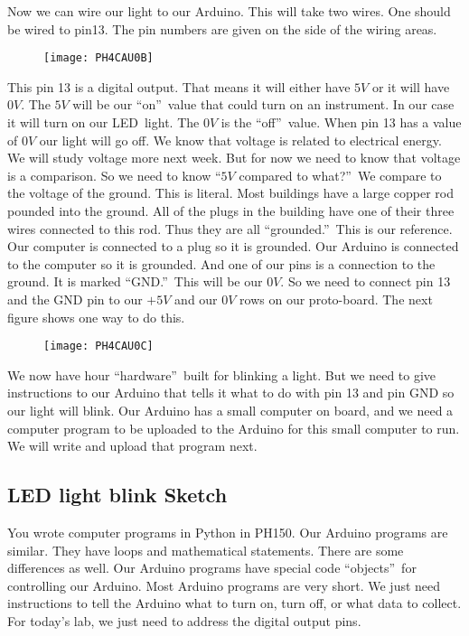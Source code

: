 Now we can wire our light to our Arduino. This will take two wires. One
should be wired to pin13. The pin numbers are given on the side of the
wiring areas. \begin{figure}[h!]
\texttt{[image: PH4CAU0B]}
\end{figure}This pin 13 is a digital output.
That means it will either have $5\unit{V}$ or it will have $0\unit{V}.$ The $%
5\unit{V}$ will be our \textquotedblleft on\textquotedblright\ value that
could turn on an instrument. In our case it will turn on our LED\ light. The 
$0\unit{V}$ is the \textquotedblleft off\textquotedblright\ value. When pin
13 has a value of $0\unit{V}$ our light will go off. We know that voltage is
related to electrical energy. We will study voltage more next week. But for
now we need to know that voltage is a comparison. So we need to know
\textquotedblleft $5\unit{V}$ compared to what?\textquotedblright\ We
compare to the voltage of the ground. This is literal. Most buildings have a
large copper rod pounded into the ground. All of the plugs in the building
have one of their three wires connected to this rod. Thus they are all
\textquotedblleft grounded.\textquotedblright\ This is our reference. Our
computer is connected to a plug so it is grounded. Our Arduino is connected
to the computer so it is grounded. And one of our pins is a connection to
the ground. It is marked \textquotedblleft GND.\textquotedblright\ This will
be our $0\unit{V}.$ So we need to connect pin 13 and the GND pin to our $+5%
\unit{V}$ and our $0\unit{V}$ rows on our proto-board. The next figure shows
one way to do this.

\begin{figure}[h!]
\texttt{[image: PH4CAU0C]}
\end{figure}

We now have hour \textquotedblleft hardware\textquotedblright\ built for
blinking a light. But we need to give instructions to our Arduino that tells
it what to do with pin 13 and pin GND so our light will blink. Our Arduino
has a small computer on board, and we need a computer program to be uploaded
to the Arduino for this small computer to run. We will write and upload that
program next.

\subsection{LED light blink Sketch}

You wrote computer programs in Python in PH150. Our Arduino programs are
similar. They have loops and mathematical statements. There are some
differences as well. Our Arduino programs have special code
\textquotedblleft objects\textquotedblright\ for controlling our Arduino.
Most Arduino programs are very short. We just need instructions to tell the
Arduino what to turn on, turn off, or what data to collect. For today's lab,
we just need to address the digital output pins.

